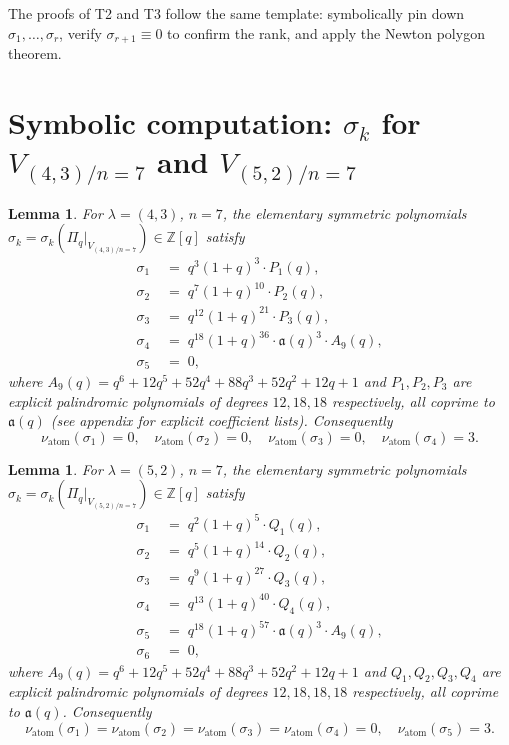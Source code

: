 \documentclass[11pt]{article}
\theoremstyle{plain}
\newtheorem{lemma}[theorem]{Lemma}
\theoremstyle{definition}
\theoremstyle{remark}
\newcommand{\Z}{\mathbb{Z}}
\newcommand{\Pibs}{\Pi_q}
\newcommand{\val}{\nu_{\mathrm{atom}}}
\newcommand{\atom}{\mathfrak{a}}
\begin{document}
The proofs of T2 and T3 follow the same template: symbolically pin down
$\sigma_1, \ldots, \sigma_r$, verify $\sigma_{r+1} \equiv 0$ to confirm the rank,
and apply the Newton polygon theorem.

\section{Symbolic computation: $\sigma_k$ for $V_{(4,3)/n=7}$ and $V_{(5,2)/n=7}$}

\begin{lemma}
\label{lem:sigma43}
For $\lambda = (4,3)$, $n = 7$, the elementary symmetric polynomials
$\sigma_k = \sigma_k(\Pibs|_{V_{(4,3)/n=7}}) \in \Z[q]$ satisfy
\begin{align}
\sigma_1 &\;=\; q^3(1+q)^3 \cdot P_1(q), \label{eq:T2-s1} \\
\sigma_2 &\;=\; q^7(1+q)^{10} \cdot P_2(q), \label{eq:T2-s2} \\
\sigma_3 &\;=\; q^{12}(1+q)^{21} \cdot P_3(q), \label{eq:T2-s3} \\
\sigma_4 &\;=\; q^{18}(1+q)^{36} \cdot \atom(q)^3 \cdot A_9(q), \label{eq:T2-s4} \\
\sigma_5 &\;=\; 0, \label{eq:T2-s5}
\end{align}
where $A_9(q) = q^6 + 12q^5 + 52q^4 + 88q^3 + 52q^2 + 12q + 1$ and
$P_1, P_2, P_3$ are explicit palindromic polynomials of degrees $12, 18, 18$
respectively, all coprime to $\atom(q)$ (see appendix for explicit coefficient lists).
Consequently
\[ \val(\sigma_1) = 0, \quad \val(\sigma_2) = 0, \quad \val(\sigma_3) = 0,
   \quad \val(\sigma_4) = 3. \]
\end{lemma}

\begin{lemma}
\label{lem:sigma52}
For $\lambda = (5,2)$, $n = 7$, the elementary symmetric polynomials
$\sigma_k = \sigma_k(\Pibs|_{V_{(5,2)/n=7}}) \in \Z[q]$ satisfy
\begin{align}
\sigma_1 &\;=\; q^2(1+q)^5 \cdot Q_1(q), \\
\sigma_2 &\;=\; q^5(1+q)^{14} \cdot Q_2(q), \\
\sigma_3 &\;=\; q^9(1+q)^{27} \cdot Q_3(q), \\
\sigma_4 &\;=\; q^{13}(1+q)^{40} \cdot Q_4(q), \\
\sigma_5 &\;=\; q^{18}(1+q)^{57} \cdot \atom(q)^3 \cdot A_9(q), \\
\sigma_6 &\;=\; 0,
\end{align}
where $A_9(q) = q^6 + 12q^5 + 52q^4 + 88q^3 + 52q^2 + 12q + 1$ and
$Q_1, Q_2, Q_3, Q_4$ are explicit palindromic polynomials of degrees $12, 18, 18, 18$
respectively, all coprime to $\atom(q)$.  Consequently
\[ \val(\sigma_1) = \val(\sigma_2) = \val(\sigma_3) = \val(\sigma_4) = 0,
   \quad \val(\sigma_5) = 3. \]
\end{lemma}
\end{document}
